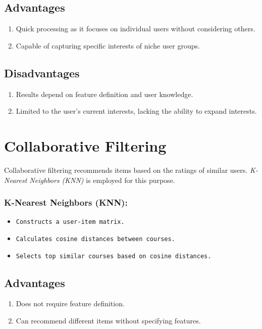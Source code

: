 \subsection{Advantages}
\begin{enumerate}
  \item \textsf{Quick processing as it focuses on individual users without considering others.}
  \item \textsf{Capable of capturing specific interests of niche user groups.}
\end{enumerate}

\subsection{Disadvantages}
\begin{enumerate}
  \item \textsf{Results depend on feature definition and user knowledge.}
  \item \textsf{Limited to the user's current interests, lacking the ability to expand interests.}
\end{enumerate}

\section{Collaborative Filtering}
Collaborative filtering recommends items based on the ratings of similar users. 
\textit{K-Nearest Neighbors (KNN)} is employed for this purpose.

\subsubsection{K-Nearest Neighbors (KNN):} 

\begin{itemize}
  \item \texttt{Constructs a user-item matrix.}
  \item \texttt{Calculates cosine distances between courses.}
  \item \texttt{Selects top similar courses based on cosine distances.}
\end{itemize}
  
\subsection{Advantages}
\begin{enumerate}
  \item \textsf{Does not require feature definition.}
  \item \textsf{Can recommend different items without specifying features.}
\end{enumerate}

